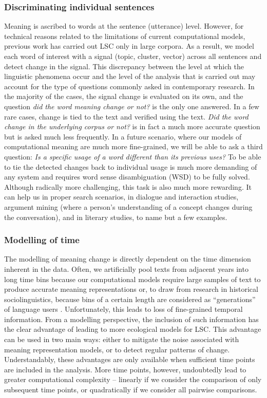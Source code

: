 \documentclass[output=paper]{langscibook}
\begin{document}
\subsubsection{Discriminating individual sentences}
\label{subsec:intent-indiv}
Meaning is ascribed to words at the sentence (utterance) level. However, for technical reasons related to the limitations of current computational models, previous work has carried out LSC only in large corpora. As a result, we model each word of interest with a signal (topic, cluster, vector) across all sentences and detect change in the signal. This discrepancy between the level at which the linguistic phenomena occur and the level of the analysis that is carried out may account for the type of questions commonly asked in contemporary research. In the majority of the cases, the signal change is evaluated on its own, and the question \textit{did the word meaning change or not?} is the only one answered. In a few rare cases, change is tied to the text and verified using the text. \textit{Did the word change in the underlying corpus or not?} is in fact a much more accurate question but is asked much less frequently. 
In a future scenario, where our models of computational meaning are much more fine-grained, we will be able to ask a third question: \textit{Is a specific usage of a word different than its previous uses?} To be able to tie the detected changes back to individual usage is much more demanding of any system and requires word sense disambiguation (WSD) to be fully solved. Although radically more challenging, this task is also much more rewarding. It can help us in proper search scenarios, in dialogue and interaction studies, argument mining (where a person's understanding of a concept changes during the conversation), and in literary studies, to name but a few examples.


\subsubsection{Modelling of time}
The modelling of meaning change is directly dependent on the time dimension inherent in the data. Often, we artificially pool texts from adjacent years into long time bins because our computational models require large samples of text to produce accurate meaning representations or, to draw from research in historical sociolinguistics, because bins of a certain length are considered as ``generations'' of language users \citep{saily2016sociolinguistic}. Unfortunately, this leads to loss of fine-grained temporal information. 
From a modelling perspective, the inclusion of such information has the clear advantage of leading to more ecological models for LSC. This advantage can be used in two main ways: either to mitigate the noise associated with meaning representation models, or to detect regular patterns of change. Understandably, these advantages are only available when sufficient time points are included in the analysis. More time points, however, undoubtedly lead to greater computational complexity -- linearly if we consider the comparison of only subsequent time points, or quadratically if we consider all pairwise comparisons.
\end{document}
